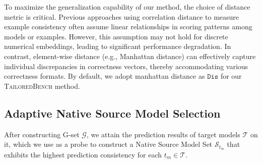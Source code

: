 To maximize the generalization capability of our method, the choice of distance metric is critical. Previous approaches \citep{AP, miller2021accuracy, baek2022agreement, mehra2024predicting} using correlation distance \citep{ref_pearsonr} to measure example consistency often assume linear relationships in scoring patterns among models or examples. However, this assumption may not hold for discrete numerical embeddings, leading to significant performance degradation. In contrast, element-wise distance (e.g., Manhattan distance) can effectively capture individual discrepancies in correctness vectors, thereby accommodating various correctness formats. 
By default, we adopt manhattan distance as $\texttt{Dis}$ for our \textsc{TailoredBench} method. 

\subsection{Adaptive Native Source Model Selection}
\label{sec:AdpSM}
After constructing G-set $\mathcal{G}$, we attain the prediction results of target models $\mathcal{T}$ on it, which we use as a probe to construct a Native Source Model Set $\mathcal{S}_{t_m}$ that exhibits the highest prediction consistency for each $t_m \in \mathcal{T}$.

